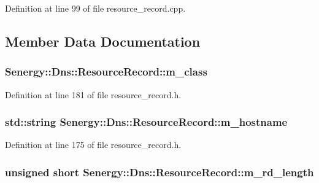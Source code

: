 Definition at line 99 of file resource\-\_\-record.\-cpp.



\subsection{Member Data Documentation}
\hypertarget{class_senergy_1_1_dns_1_1_resource_record_a8eea45baed16ff1c408682d9da59b7c6}{
\subsubsection[{m\-\_\-class}]{ Senergy\-::\-Dns\-::\-Resource\-Record\-::m\-\_\-class\hspace{0.3cm}{\ttfamily [protected]}}}\label{class_senergy_1_1_dns_1_1_resource_record_a8eea45baed16ff1c408682d9da59b7c6}


Definition at line 181 of file resource\-\_\-record.\-h.

\hypertarget{class_senergy_1_1_dns_1_1_resource_record_a3992d42302c4bc939f39c58546aaacaf}{
\subsubsection[{m\-\_\-hostname}]{\setlength{\rightskip}{0pt plus 5cm}std\-::string Senergy\-::\-Dns\-::\-Resource\-Record\-::m\-\_\-hostname\hspace{0.3cm}{\ttfamily [protected]}}}\label{class_senergy_1_1_dns_1_1_resource_record_a3992d42302c4bc939f39c58546aaacaf}


Definition at line 175 of file resource\-\_\-record.\-h.

\hypertarget{class_senergy_1_1_dns_1_1_resource_record_a598323d2f75156a289df1152e30b563b}{
\subsubsection[{m\-\_\-rd\-\_\-length}]{\setlength{\rightskip}{0pt plus 5cm}unsigned short Senergy\-::\-Dns\-::\-Resource\-Record\-::m\-\_\-rd\-\_\-length\hspace{0.3cm}{\ttfamily [protected]}}}\label{class_senergy_1_1_dns_1_1_resource_record_a598323d2f75156a289df1152e30b563b}


